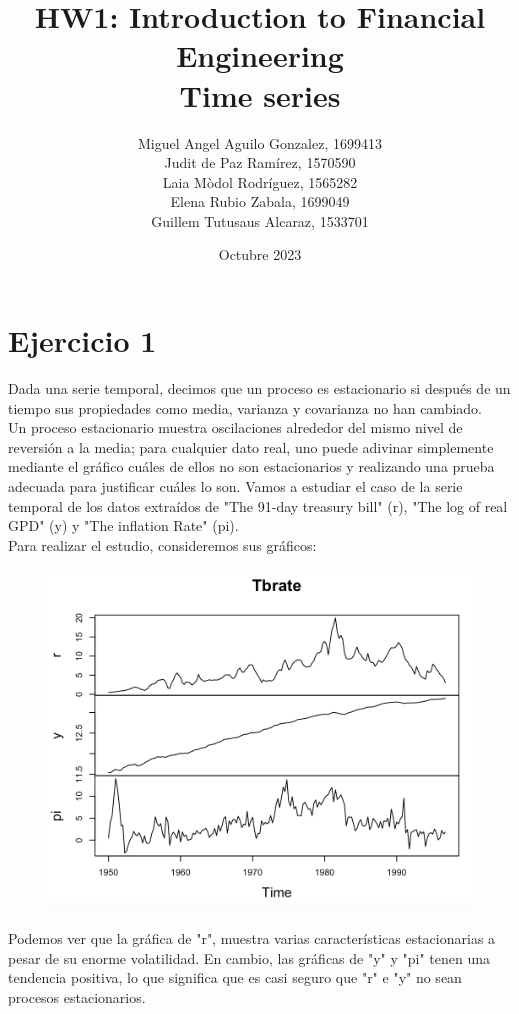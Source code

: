 \documentclass[a4paper,]{article}
\title{\textbf{HW1: Introduction to Financial Engineering} \\ Time series}
\author{Miguel Angel Aguilo Gonzalez, 1699413 \\ Judit de Paz Ramírez, 1570590 \\ Laia Mòdol Rodríguez, 1565282 \\ Elena Rubio Zabala, 1699049 \\ Guillem Tutusaus Alcaraz, 1533701 }
\date{Octubre 2023}
\begin{document}
\maketitle
\newpage

\section*{Ejercicio 1}
Dada una serie temporal, decimos que un proceso es estacionario si después de un tiempo sus propiedades como media, varianza y covarianza no han cambiado. \\

Un proceso estacionario muestra oscilaciones alrededor del mismo nivel de reversión a la media; para cualquier dato real, uno puede adivinar simplemente mediante el gráfico cuáles de ellos no son estacionarios y realizando una prueba adecuada para justificar cuáles lo son. Vamos a estudiar el caso de la serie temporal de los datos extraídos de "The 91-day treasury bill" (r), "The log of real GPD" (y) y "The inflation Rate" (pi).\\

Para realizar el estudio, consideremos sus gráficos:
\begin{figure}[h!]
    \centering
    \includegraphics[scale=0.65]{t_series_plot.png}
\end{figure}


Podemos ver que la gráfica de "r", muestra varias características  estacionarias a pesar de su enorme volatilidad. En cambio, las gráficas de "y" y "pi" tenen una tendencia positiva, lo que significa que es casi seguro que "r" e "y" no sean procesos estacionarios.
\end{document}

